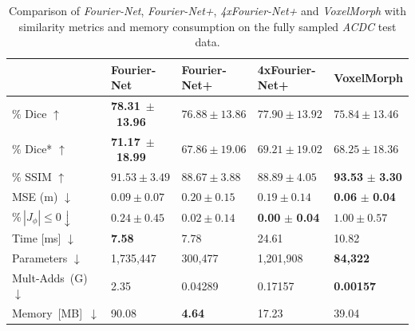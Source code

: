 \begin{table}[h] %
	\centering
	\caption{Comparison of \emph{Fourier-Net}, \emph{Fourier-Net+}, \emph{4xFourier-Net+} and \emph{VoxelMorph} with similarity metrics and memory consumption on the fully sampled \emph{ACDC} test data.}
	\label{tab:CompareVoxelMorph}
	
	\begin{tabularx}{\textwidth}{Y Y Y Y Y} 
		\toprule
		 & Fourier-Net & Fourier-Net+ & \mbox{4xFourier-Net+} & VoxelMorph \\		
		\midrule
		$\%$ Dice $\uparrow$ & \mbox{\textbf{78.31} $\pm$ \textbf{13.96}} & $76.88 \pm 13.86$ & $77.90 \pm 13.92$ & $75.84 \pm 13.46$ \\
		$\%$ Dice* $\uparrow$ & \mbox{\textbf{71.17} $\pm$ \textbf{18.99}} & $67.86 \pm 19.06$ & $69.21 \pm 19.02$ & $68.25 \pm 18.36$ \\
		$\%$ SSIM $\uparrow$ & $91.53 \pm 3.49$ & $88.67 \pm 3.88$ & $88.89 \pm 4.05$ & \textbf{93.53} $\pm$ \textbf{3.30} \\
		MSE (m) $\downarrow$ & $0.09 \pm 0.07$ & $0.20 \pm 0.15$ & $0.19 \pm 0.14$ & \textbf{0.06} $\pm$ \textbf{0.04} \\
		$\% \, |J_{\phi}|\leq0 \downarrow$ & $0.24 \pm 0.45$ & $0.02 \pm 0.14$ & \textbf{0.00} $\pm$ \textbf{0.04} & $1.00 \pm 0.57$ \\
		Time [ms] $\downarrow$ 	  & \textbf{7.58}    & 7.78 	& 24.61  	& 10.82 \\
		Parameters $\downarrow$ 	  & 1,735,447 & 300,477 	& 1,201,908 	& \textbf{84,322} \\
		\mbox{Mult-Adds (G) $\downarrow$} & 2.35      & 0.04289  & 0.17157  	& \textbf{0.00157} \\
		\mbox{Memory [MB]  $\downarrow$} 	  & 90.08     & \textbf{4.64}   	& 17.23    	& 39.04 \\
		\bottomrule
	\end{tabularx}	
\end{table}


